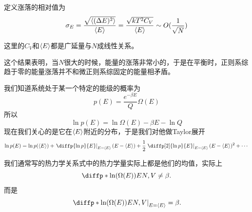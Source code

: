 \begin{definition}
       定义涨落的相对值为\begin{equation}
              \sigma_E=\frac{\sqrt{\braket{(\Delta E)^2}}}{\braket{E}}=\frac{\sqrt{kT^2C_V}}{\braket{E}}\sim O(\frac{1}{\sqrt{N}})
       \end{equation}
\end{definition}
\begin{remark}
       这里的$C_V$和$\braket{E}$都是广延量与$N$成线性关系。
\end{remark}

这个结果表明，当$N$很大的时候，能量的涨落非常小的，于是在平衡时，正则系综趋于零的能量涨落并不和微正则系综固定的能量相矛盾。

我们知道系统处于某一个特定的能级的概率为\begin{equation}
       p(E)=\frac{e^{-\beta E}}{Q} \Omega(E)
\end{equation}
所以\begin{equation}
       \ln p(E)=\ln \Omega(E)-\beta E-\ln Q
\end{equation}
现在我们关心的是它在$\braket{E}$附近的分布，于是我们对他做Taylor展开\begin{equation}
       \ln p(E)=\ln p(\braket{E})+\left.\diffp{\ln p}{E}\right|_{E=\braket{E}}(E-\braket{E})+\frac{1}{2}\left.\diffp[2]{\ln p}{E}\right|_{E=\braket{E}}(E-\braket{E})^2+\cdots
\end{equation}

\begin{remark}
       我们通常写的热力学关系式中的热力学量实际上都是他们的均值，实际上\begin{equation}
              \diffp*{\ln(\Omega(E))}{E}{N,V}\neq \beta.
       \end{equation}
       而是\begin{equation}
             \left. \diffp*{\ln(\Omega(E))}{E}{N,V}\right|_{E=\braket{E}}= \beta.
       \end{equation}
\end{remark}

